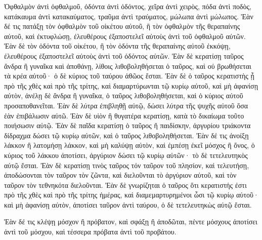 {Ὀφθαλμὸν ἀντὶ ὀφθαλμοῦ, ὀδόντα ἀντὶ ὀδόντος, χεῖρα ἀντὶ χειρὸς, πόδα ἀντὶ ποδὸς,
κατάκαυμα ἀντὶ κατακαύματος, τραῦμα ἀντὶ τραύματος, μώλωπα ἀντὶ μώλωπος.
Ἐὰν δέ τις πατάξῃ τὸν ὀφθαλμὸν τοῦ οἰκέτου αὐτοῦ, ἢ τὸν ὀφθαλμὸν τῆς θεραπαίνης αὐτοῦ, καὶ ἐκτυφλώσῃ, ἐλευθέρους ἐξαποστελεῖ αὐτοὺς ἀντὶ τοῦ ὀφθαλμοῦ αὐτῶν.
Ἐὰν δὲ τὸν ὀδόντα τοῦ οἰκέτου, ἢ τὸν ὀδόντα τῆς θεραπαίνης αὐτοῦ ἐκκόψῃ, ἐλευθέρους ἐξαποστελεῖ αὐτοὺς ἀντὶ τοῦ ὀδόντος αὐτῶν.
Ἐὰν δὲ κερατίσῃ ταῦρος ἄνδρα ἢ γυναῖκα καὶ ἀποθάνῃ, λίθοις λιθοβοληθήσεται ὁ ταῦρος, καὶ οὐ βρωθήσεται τὰ κρέα αὐτοῦ· ὁ δὲ κύριος τοῦ ταύρου ἀθῶος ἔσται.
Ἐὰν δὲ ὁ ταῦρος κερατιστὴς ᾖ πρὸ τῆς χθὲς καὶ πρὸ τῆς τρίτης, καὶ διαμαρτύρωνται τῷ κυρίῳ αὐτοῦ, καὶ μὴ ἀφανίσῃ αὐτὸν, ἀνέλῃ δὲ ἄνδρα ἢ γυναῖκα, ὁ ταῦρος λιθοβοληθήσεται, καὶ ὁ κύριος αὐτοῦ προσαποθανεῖται.
Ἐὰν δὲ λύτρα ἐπιβληθῇ αὐτῷ, δώσει λύτρα τῆς ψυχῆς αὐτοῦ ὅσα ἐὰν ἐπιβάλωσιν αὐτῶ.
Ἐὰν δὲ υἱὸν ἢ θυγατέρα κερατίσῃ, κατὰ τὸ δικαίωμα τοῦτο ποιήσωσιν αὐτῷ.
Ἐὰν δὲ παῖδα κερατίσῃ ὁ ταῦρος ἢ παιδίσκην, ἀργυρίου τριάκοντα δίδραχμα δώσει τῷ κυρίῳ αὐτῶν, καὶ ὁ ταῦρος λιθοβοληθήσεται.
Ἐὰν δέ τις ἀνοίξῃ λάκκον ἢ λατομήσῃ λάκκον, καὶ μὴ καλύψῃ αὐτὸν, καὶ ἐμπέσῃ ἐκεῖ μόσχος ἢ ὄνος,
ὁ κύριος τοῦ λάκκου ἀποτίσει, ἀργύριον δώσει τῷ κυρίῳ αὐτῶν· τὸ δὲ τετελευτηκὸς αὐτῷ ἔσται.
Ἐὰν δὲ κερατίσῃ τινὸς ταῦρος τόν ταῦρον τοῦ πλησίον, καὶ τελευτήσῃ, ἀποδώσονται τὸν ταῦρον τὸν ζῶντα, καὶ διελοῦνται τὸ ἀργύριον αὐτοῦ, καὶ τὸν ταῦρον τὸν τεθνηκότα διελοῦνται.
Ἐὰν δὲ γνωρίζηται ὁ ταῦρος ὅτι κερατιστής ἐστι πρὸ τῆς χθὲς καὶ πρὸ τῆς τρίτης ἡμέρας, καὶ διαμεμαρτυρημένοι ὦσι τῷ κυρίῳ αὐτοῦ· καὶ μὴ ἀφανίσῃ αὐτὸν, ἀποτίσει ταῦρον ἀντὶ ταύρου, ὁ δὲ τετελευτηκὼς αὐτῷ ἔσται.
\par }{\PP {}Ἐὰν δέ τις κλέψῃ μόσχον ἢ πρόβατον, καὶ σφάξῃ ἢ ἀποδῶται, πέντε μόσχους ἀποτίσει ἀντὶ τοῦ μόσχου, καὶ τέσσερα πρόβατα ἀντὶ τοῦ προβάτου.

}
